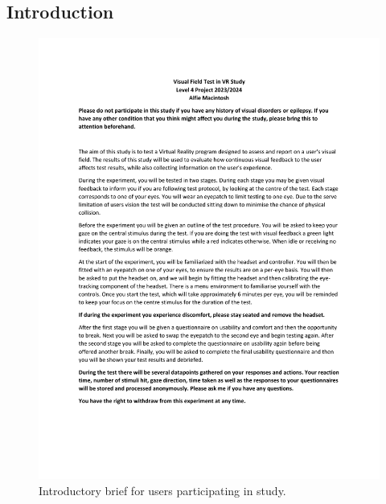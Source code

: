 \documentclass{l4proj}
\begin{document}
\begin{appendices}
\subsection{Introduction} \label{appendix:introduction}
\begin{figure}[htbp]
    \centering
    \includegraphics[width=0.9\linewidth]{dissertation/images/Introduction.pdf}    
    \caption{Introductory brief for users participating in study.}
\end{figure}
\newpage

\end{appendices}
\end{document}
